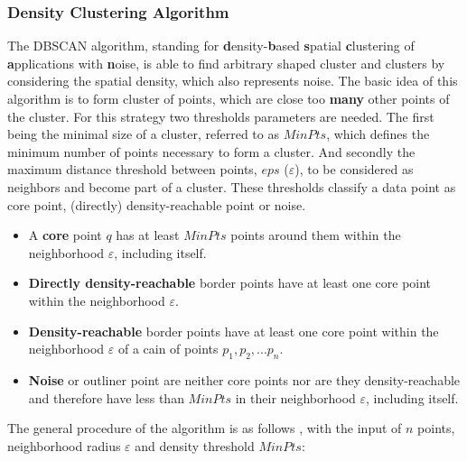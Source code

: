\subsubsection{Density Clustering Algorithm}
The DBSCAN algorithm, standing for \textbf{d}ensity-\textbf{b}ased \textbf{s}patial \textbf{c}lustering of \textbf{a}pplications with \textbf{n}oise, is able to find arbitrary shaped cluster and clusters by considering the spatial density, which also represents noise. The basic idea of this algorithm is to form cluster of points, which are close too \textbf{many} other points of the cluster. For this strategy two thresholds parameters are needed. The first being the minimal size of a cluster, referred to as $MinPts$, which defines the minimum number of points necessary to form a cluster. And secondly the maximum distance threshold between points, $eps$ ($\varepsilon$), to be considered as neighbors and become part of a cluster. These thresholds classify a data point as core point, (directly) density-reachable point or noise. \parencite{Yildirim2020,Chauhan2020,Padro2017}

\begin{itemize}
	\item A \textbf{core} point $q$ has at least $MinPts$ points around them within the neighborhood $\varepsilon$, including itself.
    \item \textbf{Directly density-reachable} border points have at least one core point within the neighborhood $\varepsilon$.
     \item \textbf{Density-reachable} border points have at least one core point within the neighborhood $\varepsilon$ of a cain of points $p_1,p_2,...p_n$.
 	\item \textbf{Noise} or outliner point are neither core points nor are they density-reachable and therefore have less than $MinPts$ in their neighborhood $\varepsilon$, including itself.
\end{itemize}

The general procedure of the algorithm is as follows \parencite{Zhao2018}, with the input of $n$ points, neighborhood radius $\varepsilon$ and density threshold $MinPts$:

